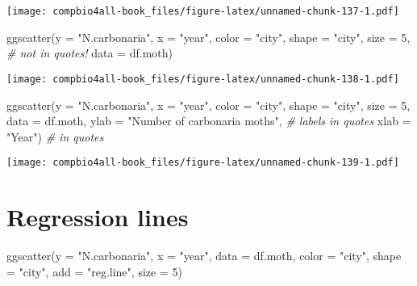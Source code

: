 \documentclass[
]{book}
\newenvironment{Shaded}{\begin{snugshade}}{\end{snugshade}}
\newcommand{\AttributeTok}[1]{\textcolor[rgb]{0.77,0.63,0.00}{#1}}
\newcommand{\CommentTok}[1]{\textcolor[rgb]{0.56,0.35,0.01}{\textit{#1}}}
\newcommand{\DecValTok}[1]{\textcolor[rgb]{0.00,0.00,0.81}{#1}}
\newcommand{\FunctionTok}[1]{\textcolor[rgb]{0.00,0.00,0.00}{#1}}
\newcommand{\NormalTok}[1]{#1}
\newcommand{\StringTok}[1]{\textcolor[rgb]{0.31,0.60,0.02}{#1}}
\begin{document}
\texttt{[image: compbio4all-book\_files/figure-latex/unnamed-chunk-137-1.pdf]}

\begin{Shaded}
\begin{Highlighting}[]
\FunctionTok{ggscatter}\NormalTok{(}\AttributeTok{y =} \StringTok{"N.carbonaria"}\NormalTok{,}
          \AttributeTok{x =} \StringTok{"year"}\NormalTok{,}
          \AttributeTok{color =} \StringTok{"city"}\NormalTok{,}
          \AttributeTok{shape =} \StringTok{"city"}\NormalTok{,}
          \AttributeTok{size =} \DecValTok{5}\NormalTok{,       }\CommentTok{\# not in quotes!}
          \AttributeTok{data =}\NormalTok{ df.moth)}
\end{Highlighting}
\end{Shaded}

\texttt{[image: compbio4all-book\_files/figure-latex/unnamed-chunk-138-1.pdf]}

\begin{Shaded}
\begin{Highlighting}[]
\FunctionTok{ggscatter}\NormalTok{(}\AttributeTok{y =} \StringTok{"N.carbonaria"}\NormalTok{,}
          \AttributeTok{x =} \StringTok{"year"}\NormalTok{,}
          \AttributeTok{color =} \StringTok{"city"}\NormalTok{,}
          \AttributeTok{shape =} \StringTok{"city"}\NormalTok{,}
          \AttributeTok{size =} \DecValTok{5}\NormalTok{,       }
          \AttributeTok{data =}\NormalTok{ df.moth,}
          \AttributeTok{ylab =} \StringTok{"Number of carbonaria moths"}\NormalTok{, }\CommentTok{\# labels in quotes}
          \AttributeTok{xlab =} \StringTok{"Year"}\NormalTok{)   }\CommentTok{\# in quotes}
\end{Highlighting}
\end{Shaded}

\texttt{[image: compbio4all-book\_files/figure-latex/unnamed-chunk-139-1.pdf]}

\hypertarget{regression-lines}{%
\section{Regression lines}\label{regression-lines}}

\begin{Shaded}
\begin{Highlighting}[]
\FunctionTok{ggscatter}\NormalTok{(}\AttributeTok{y =} \StringTok{"N.carbonaria"}\NormalTok{,}
          \AttributeTok{x =} \StringTok{"year"}\NormalTok{,}
          \AttributeTok{data =}\NormalTok{ df.moth,}
          \AttributeTok{color =} \StringTok{"city"}\NormalTok{,}
          \AttributeTok{shape =} \StringTok{"city"}\NormalTok{,}
          \AttributeTok{add =} \StringTok{"reg.line"}\NormalTok{,}
          \AttributeTok{size =} \DecValTok{5}\NormalTok{)}
\end{Highlighting}
\end{Shaded}
\end{document}
